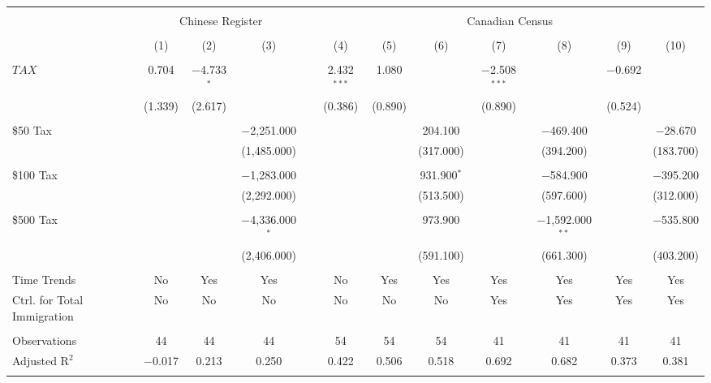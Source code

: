 
\begin{tabular}{@{\extracolsep{5pt}}lccccccccccc} 
\\[-1.8ex]\hline 
\hline \\[-1.8ex] 
 & \multicolumn{3}{c}{Chinese Register} & & \multicolumn{7}{c}{Canadian Census} \\ 
 \cline{2-4} \cline{6-12}
\\[-1.8ex] & (1) & (2) & (3) & & (4) & (5) & (6) & (7) & (8) & (9) & (10)\\ 
\hline \\[-1.8ex] 
 $TAX$ & 0.704 & $-$4.733$^{*}$ & &  & 2.432$^{***}$ & 1.080 &  & $-$2.508$^{***}$ &  & $-$0.692 &  \\ 
  & (1.339) & (2.617) & & & (0.386) & (0.890) &  & (0.890) &  & (0.524) &  \\ 
  & & & & & & & & & & & \\ 
 \$50 Tax &  &  & $-$2,251.000 & &  &  & 204.100 &  & $-$469.400 &  & $-$28.670 \\ 
  &  &  & (1,485.000) & &  &  & (317.000) &  & (394.200) &  & (183.700) \\ 
  & & & & & & & & & & & \\ 
 \$100 Tax &  &  & $-$1,283.000 & &  &  & 931.900$^{*}$ &  & $-$584.900 &  & $-$395.200 \\ 
  &  &  & (2,292.000) &  & &  & (513.500) &  & (597.600) &  & (312.000) \\ 
  & & & & & & & & & & & \\ 
 \$500 Tax &  &  & $-$4,336.000$^{*}$ & & &  & 973.900 &  & $-$1,592.000$^{**}$ &  & $-$535.800 \\ 
  &  &  & (2,406.000) & & &  & (591.100) &  & (661.300) &  & (403.200) \\ 
  & & & & & & & & & & & \\ 
Time Trends & No & Yes & Yes & & No & Yes & Yes & Yes & Yes & Yes & Yes \\ 
Ctrl. for Total Immigration & No & No & No & & No & No & No & Yes & Yes & Yes & Yes \\ 
\hline \\[-1.8ex] 
Observations & 44 & 44 & 44 & & 54 & 54 & 54 & 41 & 41 & 41 & 41 \\ 
Adjusted R$^{2}$ & $-$0.017 & 0.213 & 0.250 & & 0.422 & 0.506 & 0.518 & 0.692 & 0.682 & 0.373 & 0.381 \\ 
\hline \\[-1.8ex]  
\end{tabular} 
